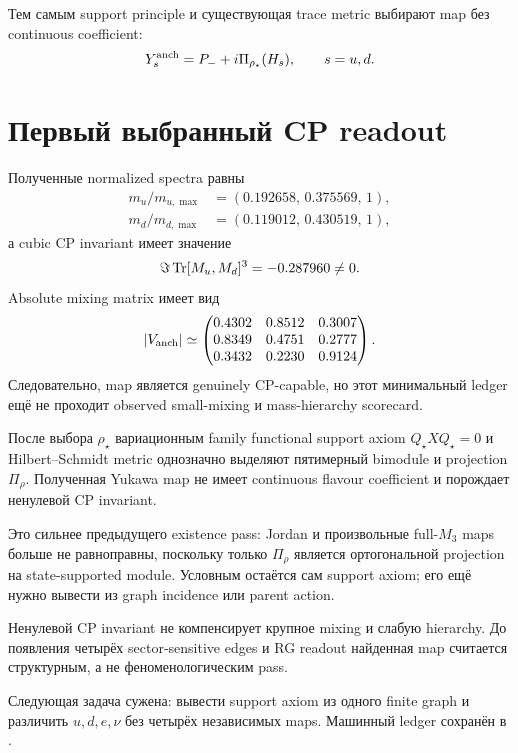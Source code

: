 Тем самым support principle и существующая trace metric выбирают map без
continuous coefficient:
\begin{equation}
 Y_s^{\rm anch}=P_-+i\Pi_{\rho_\star}(H_s),
 \qquad s=u,d.
\end{equation}

\section{Первый выбранный CP readout}

Полученные normalized spectra равны
\begin{align}
 m_u/m_{u,\max}&=(0.192658,\,0.375569,\,1),\\
 m_d/m_{d,\max}&=(0.119012,\,0.430519,\,1),
\end{align}
а cubic CP invariant имеет значение
\begin{equation}
 \Im\operatorname{Tr}[M_u,M_d]^3=-0.287960\ne0.
\end{equation}
Absolute mixing matrix имеет вид
\begin{equation}
 |V_{\rm anch}|\simeq
 \begin{pmatrix}
 0.4302&0.8512&0.3007\\
 0.8349&0.4751&0.2777\\
 0.3432&0.2230&0.9124
 \end{pmatrix}.
\end{equation}
Следовательно, map является genuinely CP-capable, но этот минимальный ledger
ещё не проходит observed small-mixing и mass-hierarchy scorecard.

\begin{theorem}
После выбора \(\rho_\star\) вариационным family functional support axiom
\(Q_\star XQ_\star=0\) и Hilbert--Schmidt metric однозначно выделяют
пятимерный bimodule и projection \(\Pi_\rho\). Полученная Yukawa map не имеет
continuous flavour coefficient и порождает ненулевой CP invariant.
\end{theorem}

\begin{remark}
Это сильнее предыдущего existence pass: Jordan и произвольные full-\(M_3\)
maps больше не равноправны, поскольку только \(\Pi_\rho\) является
ортогональной projection на state-supported module. Условным остаётся сам
support axiom; его ещё нужно вывести из graph incidence или parent action.
\end{remark}

\begin{nogocriterion}
Ненулевой CP invariant не компенсирует крупное mixing и слабую hierarchy.
До появления четырёх sector-sensitive edges и RG readout найденная map
считается структурным, а не феноменологическим pass.
\end{nogocriterion}

Следующая задача сужена: вывести support axiom из одного finite graph и
различить \(u,d,e,\nu\) без четырёх независимых maps. Машинный ledger сохранён
в .